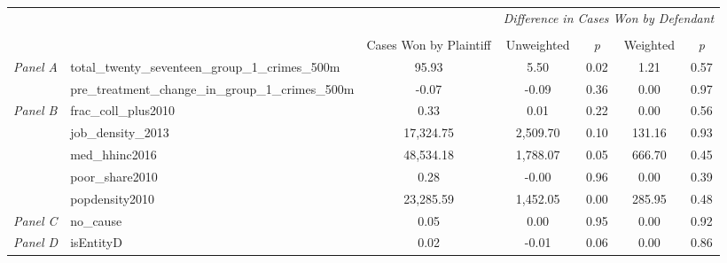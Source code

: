 \begin{tabular}{llccccc}
\toprule
 &  & \textit{} & \multicolumn{4}{c}{\textit{Difference in Cases Won by Defendant}} \\
\cline{4-7}
\\
 &  & Cases Won by Plaintiff & Unweighted & \emph{p} & Weighted & \emph{p} \\
\midrule
\multirow[c]{2}{3cm}{\textit{Panel A}} & total_twenty_seventeen_group_1_crimes_500m & 95.93 & 5.50 & 0.02 & 1.21 & 0.57 \\
 & pre_treatment_change_in_group_1_crimes_500m & -0.07 & -0.09 & 0.36 & 0.00 & 0.97 \\
\cline{1-7}
\multirow[c]{5}{3cm}{\textit{Panel B}} & frac_coll_plus2010 & 0.33 & 0.01 & 0.22 & 0.00 & 0.56 \\
 & job_density_2013 & 17,324.75 & 2,509.70 & 0.10 & 131.16 & 0.93 \\
 & med_hhinc2016 & 48,534.18 & 1,788.07 & 0.05 & 666.70 & 0.45 \\
 & poor_share2010 & 0.28 & -0.00 & 0.96 & 0.00 & 0.39 \\
 & popdensity2010 & 23,285.59 & 1,452.05 & 0.00 & 285.95 & 0.48 \\
\cline{1-7}
\textit{Panel C} & no_cause & 0.05 & 0.00 & 0.95 & 0.00 & 0.92 \\
\cline{1-7}
\textit{Panel D} & isEntityD & 0.02 & -0.01 & 0.06 & 0.00 & 0.86 \\
\cline{1-7}
\bottomrule
\end{tabular}

